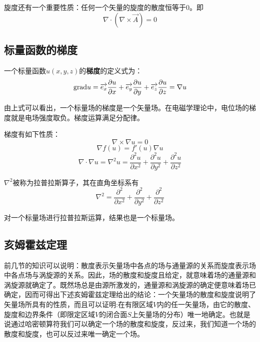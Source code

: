 \documentclass[UTF8,a4paper,11pt]{article}
\begin{document}
旋度还有一个重要性质：任何一个矢量的旋度的散度恒等于0。即
\begin{equation}
\nabla\cdot(\nabla\times\overrightarrow{A})=0
\end{equation}

\subsection{标量函数的梯度}
一个标量函数$u(x,y,z)$的\textbf{梯度}的定义式为：
\begin{equation}
{\rm grad}u=\overrightarrow{e_x}\frac{\partial u}{\partial x}+\overrightarrow{e_y}\frac{\partial u}{\partial y}+\overrightarrow{e_z}\frac{\partial u}{\partial z}=\nabla u
\end{equation}

由上式可以看出，一个标量场的梯度是一个矢量场。在电磁学理论中，电位场的梯度就是电场强度取负。梯度运算满足分配律。

梯度有如下性质：
\begin{equation}
\nabla\times\nabla u=0
\end{equation}
\begin{equation}
\nabla f(u)=f'(u)\nabla u
\end{equation}
\begin{equation}
\nabla\cdot\nabla u=\nabla^2u=\frac{\partial^2 u}{\partial x^2}+\frac{\partial^2 u}{\partial y^2}+\frac{\partial^2 u}{\partial z^2}
\end{equation}

$\nabla^2$被称为拉普拉斯算子，其在直角坐标系有
\begin{equation}
\nabla^2=\frac{\partial^2}{\partial x^2}+\frac{\partial^2}{\partial y^2}+\frac{\partial^2}{\partial z^2}
\end{equation}

对一个标量场进行拉普拉斯运算，结果也是一个标量场。

\subsection{亥姆霍兹定理}
前几节的知识可以说明：散度表示矢量场中各点的场与通量源的关系而旋度表示场中各点场与涡旋源的关系。因此，场的散度和旋度且给定，就意味着场的通量源和涡旋源就确定了。既然场总是由源所激发的，通量源和涡旋源的确定便意味着场已确定，因而可得出下述亥姆霍兹定理给出的结论：一个矢量场的散度和旋度说明了矢量场所具有的性质，而且可以证明:在有限区域$V$内的任一矢量场，由它的散度、旋度和边界条件（即限定区域$V$的闭合面$S$上矢量场的分布）唯一地确定。也就是说通过哈密顿算符我们可以确定一个场的散度和旋度，反过来，我们知道一个场的散度和旋度，也可以反过来唯一确定一个场。
\end{document}
